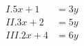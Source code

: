 \documentclass[preview]{standalone}
\begin{document}
\begin{align*}
I. 5x + 1 &= 3y\\ II. 3x+2 &= 5y \\ III. 2x+4 &= 6y
\end{align*}
\end{document}
